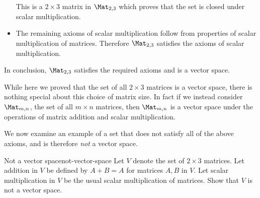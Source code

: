 \begin{solution}
\begin{itemize}
This is a $2 \times 3$ matrix in $\Mat_{2,3}$ which proves that the set is closed under scalar multiplication. 

\item The remaining axioms of scalar multiplication follow from properties of scalar multiplication of matrices. Therefore $\Mat_{2,3}$ satisfies the axioms of scalar multiplication. 
\end{itemize}

In conclusion, $\Mat_{2,3}$ satisfies the required axioms and is a vector space. 
\end{solution}

While here we proved that the set of all $2 \times 3$ matrices is a vector space, there is nothing special about this choice of matrix size. In fact if we instead consider $\Mat_{m,n}$, the set of all $m \times n$ matrices, then  $\Mat_{m,n}$ is a vector space under the operations of matrix addition and scalar multiplication. 

We now examine an example of a set that does not satisfy all of the above axioms, and is therefore \textit{not} a vector space. 

\begin{example}{Not a vector space}{not-vector-space}
Let $V$ denote the set of $2 \times 3$ matrices. Let addition in $V$ be defined by $A + B = A$ for matrices $A,B$ in $V$. Let scalar multiplication in $V$ be the usual scalar multiplication of matrices. Show that $V$ is not a vector space.
\end{example}

